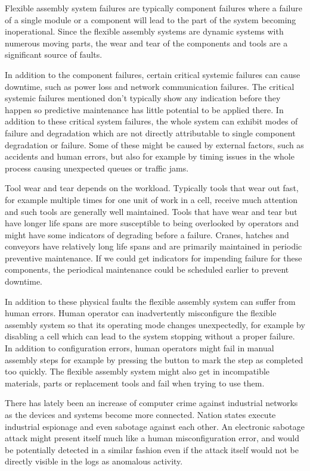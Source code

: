 \documentclass[journal]{IEEEtran}
\begin{document}
Flexible assembly system failures are typically component failures where a failure of a single module or a component will lead to the part of the system becoming inoperational.
Since the flexible assembly systems are dynamic systems with numerous moving parts, the wear and tear of the components and tools are a significant source of faults.

In addition to the component failures, certain critical systemic failures can cause downtime, such as power loss and network communication failures.
The critical systemic failures mentioned don't typically show any indication before they happen so predictive maintenance has little potential to be applied there.
In addition to these critical system failures,
the whole system can exhibit modes of failure and degradation which are not directly attributable to single component degradation or failure.
Some of these might be caused by
external factors, such as accidents and human errors, but also for example by timing issues in the whole process causing unexpected queues or traffic jams.

Tool wear and tear depends on the workload. Typically tools that wear out fast, for example multiple times for one unit of work in a cell, receive much attention and such tools are generally
well maintained. Tools that have wear and tear but have longer life spans are more susceptible to being overlooked by operators and might have some indicators of degrading
before a failure. Cranes, hatches and conveyors have relatively long life spans and are primarily maintained in periodic preventive maintenance. If we could get indicators
for impending failure for these components, the periodical maintenance could be scheduled earlier to prevent downtime.

In addition to these physical faults the flexible
assembly system can suffer from human errors. Human operator can inadvertently misconfigure the flexible assembly system so that its operating mode changes unexpectedly,
for example by disabling a cell which can lead to the system stopping without a proper failure. In addition to configuration
errors, human operators might fail in manual assembly steps for example by pressing the button to mark the step
as completed too quickly.
The flexible assembly system might also get in incompatible materials, parts or replacement tools and fail when trying to use them.

There has lately been an increase of computer crime against industrial networks as the devices and systems become more connected.
Nation states execute industrial espionage and even sabotage against each other\cite{stuxnet}. An electronic sabotage attack might present itself
much like a human misconfiguration error, and would be potentially detected in a similar fashion even if the attack itself would not be
directly visible in the logs as anomalous activity.
\end{document}
